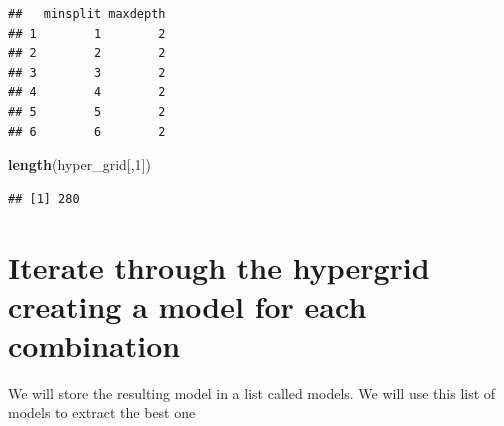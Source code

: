 \documentclass[]{article}
\newenvironment{Shaded}{\begin{snugshade}}{\end{snugshade}}
\newcommand{\KeywordTok}[1]{\textcolor[rgb]{0.13,0.29,0.53}{\textbf{#1}}}
\newcommand{\DataTypeTok}[1]{\textcolor[rgb]{0.13,0.29,0.53}{#1}}
\newcommand{\DecValTok}[1]{\textcolor[rgb]{0.00,0.00,0.81}{#1}}
\newcommand{\StringTok}[1]{\textcolor[rgb]{0.31,0.60,0.02}{#1}}
\newcommand{\CommentTok}[1]{\textcolor[rgb]{0.56,0.35,0.01}{\textit{#1}}}
\newcommand{\ControlFlowTok}[1]{\textcolor[rgb]{0.13,0.29,0.53}{\textbf{#1}}}
\newcommand{\OperatorTok}[1]{\textcolor[rgb]{0.81,0.36,0.00}{\textbf{#1}}}
\newcommand{\NormalTok}[1]{#1}
\begin{document}
\begin{verbatim}
##   minsplit maxdepth
## 1        1        2
## 2        2        2
## 3        3        2
## 4        4        2
## 5        5        2
## 6        6        2
\end{verbatim}

\begin{Shaded}
\begin{Highlighting}[]
\KeywordTok{length}\NormalTok{(hyper_grid[,}\DecValTok{1}\NormalTok{])}
\end{Highlighting}
\end{Shaded}

\begin{verbatim}
## [1] 280
\end{verbatim}

\section{Iterate through the hypergrid creating a model for each
combination}\label{iterate-through-the-hypergrid-creating-a-model-for-each-combination}

We will store the resulting model in a list called models. We will use
this list of models to extract the best one

\begin{Shaded}
\end{Shaded}
\end{document}
